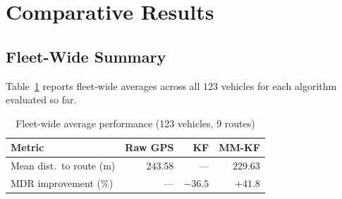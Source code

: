 \documentclass[12pt, a4paper]{article}
\begin{document}
%
%

\section{Comparative Results}
\label{sec:results}

\subsection{Fleet-Wide Summary}

Table~\ref{tab:fleet_results} reports fleet-wide averages across all 123
vehicles for each algorithm evaluated so far.

\begin{table}[H]
\centering
\caption{Fleet-wide average performance (123 vehicles, 9 routes)}
\label{tab:fleet_results}
\begin{tabular}{lrrr}
\toprule
\textbf{Metric} & \textbf{Raw GPS} & \textbf{KF} & \textbf{MM-KF} \\
\midrule
Mean dist.\ to route (m) & 243.58 & ---     & 229.63 \\
MDR improvement (\%)     & ---    & $-36.5$ & $\mathbf{+41.8}$ \\
\bottomrule
\end{tabular}
\end{table}
\end{document}
